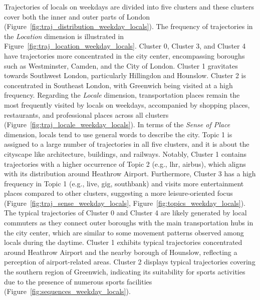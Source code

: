 \documentclass{article}
\theoremstyle{remark}
\begin{document}
Trajectories of locals on weekdays are divided into five clusters and these clusters cover both the inner and outer parts of London  (Figure~\ref{fig:traj_distribution_weekday_locals}). The frequency of trajectories in the \textit{Location} dimension is illustrated in Figure~\ref{fig:traj_location_weekday_locals}. Cluster 0, Cluster 3, and Cluster 4 have trajectories more concentrated in the city center, encompassing boroughs such as Westminster, Camden, and the City of London. Cluster 1 gravitates towards Southwest London, particularly Hillingdon and Hounslow. Cluster 2 is concentrated in Southeast London, with Greenwich being visited at a high frequency. Regarding the \textit{Locale} dimension, transportation places remain the most frequently visited by locals on weekdays, accompanied by shopping places, restaurants, and professional places across all clusters (Figure~\ref{fig:traj_locale_weekday_locals}). In terms of the \textit{Sense of Place} dimension, locals tend to use general words to describe the city. Topic 1 is assigned to a large number of trajectories in all five clusters, and it is about the cityscape like architecture, buildings, and railways. Notably, Cluster 1 contains trajectories with a higher occurrence of Topic 2 (e.g., lhr, airbus), which aligns with its distribution around Heathrow Airport. Furthermore, Cluster 3 has a high frequency in Topic 1 (e.g., live, gig, southbank) and visits more entertainment places compared to other clusters, suggesting a more leisure-oriented focus (Figure~\ref{fig:traj_sense_weekday_locals}, Figure~\ref{fig:topics_weekday_locals}). The typical trajectories of Cluster 0 and Cluster 4 are likely generated by local commuters as they connect outer boroughs with the main transportation hubs in the city center, which are similar to some movement patterns observed among locals during the daytime. Cluster 1 exhibits typical trajectories concentrated around Heathrow Airport and the nearby borough of Hounslow, reflecting a perception of airport-related areas. Cluster 2 displays typical trajectories covering the southern region of Greenwich, indicating its suitability for sports activities due to the presence of numerous sports facilities (Figure~\ref{fig:sequences_weekday_locals}).
\end{document}
